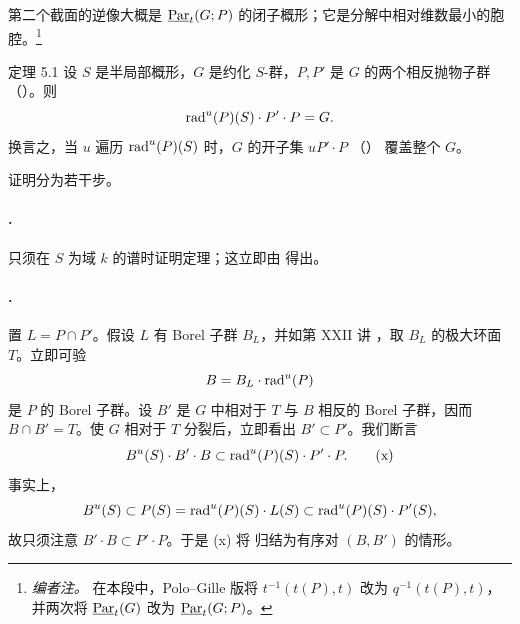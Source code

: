 第二个截面的逆像大概是 \(\Par_t(G;P)\) 的闭子概形；它是分解中相对维数最小的胞腔。\footnote{\emph{编者注。} 在本段中，Polo--Gille 版将 \(t^{-1}(t(P),t)\) 改为 \(q^{-1}(t(P),t)\)，并两次将 \(\Par_t(G)\) 改为 \(\Par_t(G;P)\)。}


\begin{sgastatement}{定理 5.1}
设 \(S\) 是半局部概形，\(G\) 是约化 \(S\)-群，\(P,P'\) 是 \(G\) 的两个相反抛物子群 \textup{（）}。则
\[
 \rad^u(P)(S)\cdot P'\cdot P=G.
\]
换言之，当 \(u\) 遍历 \(\rad^u(P)(S)\) 时，\(G\) 的开子集 \(uP'\cdot P\) \textup{（）} 覆盖整个 \(G\)。
\end{sgastatement}

证明分为若干步。

\paragraph{.}
只须在 \(S\) 为域 \(k\) 的谱时证明定理；这立即由  得出。

\paragraph{.}
置 \(L=P\cap P'\)。假设 \(L\) 有 Borel 子群 \(B_L\)，并如第 XXII 讲 ，取 \(B_L\) 的极大环面 \(T\)。立即可验
\[
 B=B_L\cdot\rad^u(P)
\]
是 \(P\) 的 Borel 子群。设 \(B'\) 是 \(G\) 中相对于 \(T\) 与 \(B\) 相反的 Borel 子群，因而 \(B\cap B'=T\)。使 \(G\) 相对于 \(T\) 分裂后，立即看出 \(B'\subset P'\)。我们断言
\[
 B^u(S)\cdot B'\cdot B
 \subset \rad^u(P)(S)\cdot P'\cdot P.                 \tag{x}\label{sga3:xxvi:theorem:5-1:equation:x}
\]
事实上，
\[
 B^u(S)\subset P(S)
 =\rad^u(P)(S)\cdot L(S)
 \subset\rad^u(P)(S)\cdot P'(S),
\]
故只须注意 \(B'\cdot B\subset P'\cdot P\)。于是 \textup{(x)} 将 归结为有序对 \((B,B')\) 的情形。

